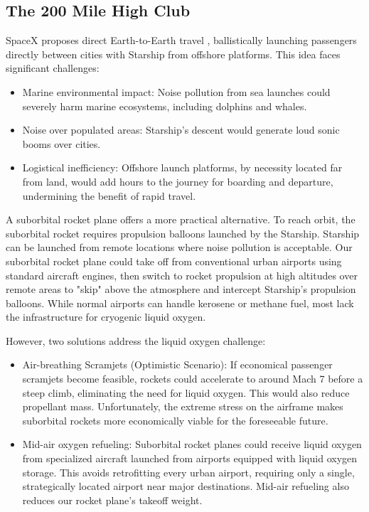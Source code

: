 \documentclass{article}
\begin{document}
{\subsection{The 200 Mile High Club}
SpaceX proposes direct Earth-to-Earth travel \cite{earth_to_earth}, ballistically launching passengers directly between cities with Starship from offshore platforms. This idea faces significant challenges:
\begin{itemize}
\item Marine environmental impact: Noise pollution from sea launches could severely harm marine ecosystems, including dolphins and whales.
\item Noise over populated areas: Starship's descent would generate loud sonic booms over cities.
\item Logistical inefficiency: Offshore launch platforms, by necessity located far from land, would add hours to the journey for boarding and departure, undermining the benefit of rapid travel.
\end{itemize}
A suborbital rocket plane offers a more practical alternative. To reach orbit, the suborbital rocket requires propulsion balloons launched by the Starship.   Starship can be launched from remote locations where noise pollution is acceptable.  Our suborbital rocket plane could take off from conventional urban airports using standard aircraft engines, then switch to rocket propulsion at high altitudes over remote areas to "skip" above the atmosphere and intercept Starship's propulsion balloons.   While normal airports can handle kerosene or methane fuel, most lack the infrastructure for cryogenic liquid oxygen.

However, two solutions address the liquid oxygen challenge:
\begin{itemize}
\item Air-breathing Scramjets (Optimistic Scenario): If economical passenger scramjets become feasible, rockets could accelerate to around Mach 7 before a steep climb, eliminating the need for liquid oxygen. This would also reduce propellant mass. Unfortunately, the extreme stress on the airframe makes suborbital rockets more economically viable for the foreseeable future.
\item Mid-air oxygen refueling: Suborbital rocket planes could receive liquid oxygen from specialized aircraft launched from airports equipped with liquid oxygen storage. This avoids retrofitting every urban airport, requiring only a single, strategically located airport near major destinations.   Mid-air refueling also reduces our rocket plane's takeoff weight.
\end{itemize}

}
\end{document}
